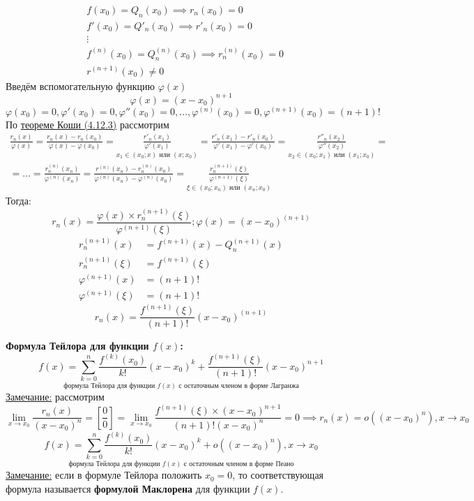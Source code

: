 \documentclass[12pt]{article}
\begin{document}
    \begin{adjustwidth}{1.5em}{1.5em}
        \begin{align*}
            &f(x_0) = Q_n(x_0) \implies r_n(x_0) = 0\\
            &f'(x_0) = Q'_n(x_0) \implies r'_n(x_0) = 0\\
            &\vdots\\
            &f^{(n)}(x_0) = Q^{(n)}_n(x_0) \implies r^{(n)}_n(x_0) = 0\\
            &r^{(n+1)}(x_0) \ne 0
        \end{align*}
        Введём вспомогательную функцию $\varphi(x)$
        \[ \varphi(x) = (x-x_0)^{n+1} \]
        \[ \varphi(x_0) = 0, \varphi'(x_0) = 0, \varphi''(x_0) = 0, \dots, \varphi^{(n)}(x_0) = 0, \varphi^{(n+1)}(x_0) = (n+1)! \]
        По \hyperref[th:4.12.3]{теореме Коши (4.12.3)} рассмотрим
        \begin{gather*}
            \boxed{ \frac{r_n(x)}{\varphi(x)} } = \frac{r_n(x) - r_n(x_0)}{\varphi(x) - \varphi(x_0)} = \underset{x_1 \in (x_0; x) \text{ или } (x; x_0)}{\frac{r'_n(x_1)}{\varphi'(x_1)}} = \frac{r'_n(x_1) - r'_n(x_0)}{\varphi'(x_1) - \varphi'(x_0)} = \underset{x_2 \in (x_0; x_1) \text{ или } (x_1; x_0)}{\frac{r''_n(x_2)}{\varphi''(x_2)}} =\\
            = \dots = \frac{r^{(n)}_n(x_n)}{\varphi^{(n)}(x_n)} = \frac{r^{(n)}(x_n) - r^{(n)}_n(x_0)}{\varphi^{(n)}(x_n)-\varphi^{(n)}(x_0)} = \underset{\xi \in (x_0;x_n) \text{ или } (x_n; x_0)}{\boxed{\frac{r^{(n+1)}_n(\xi)}{\varphi^{(n+1)}(\xi)}}}
        \end{gather*}
        Тогда: \[ r_n(x) = \frac{\varphi(x) \times r^{(n+1)}_n(\xi)}{\varphi^{(n+1)}(\xi)}; \varphi(x) = (x-x_0)^{(n+1)} \]
        \begin{align*}
            r^{(n+1)}_n (x) &= f^{(n+1)}(x) - Q^{(n+1)}_n(x)\\
            r^{(n+1)}_n (\xi) &= f^{(n+1)}(\xi)\\
            \varphi^{(n+1)} (x) &= (n+1)!\\
            \varphi^{(n+1)} (\xi) &= (n+1)!
        \end{align*}
        \[ r_n(x) = \frac{f^{(n+1)}(\xi)}{(n+1)!}(x-x_0)^{(n+1)} \]
    \end{adjustwidth}
    \textbf{Формула Тейлора для функции $f(x)$:}
    \[ \underset{\text{формула Тейлора для функции }f(x)\text{ с остаточным членом в форме Лагранжа}}{\boxed{ f(x) = \sum_{k = 0}^{n} \frac{f^{(k)}(x_0)}{k!}(x-x_0)^k + \frac{f^{(n+1)}(\xi)}{(n+1)!}(x-x_0)^{n+1} }} \]
    \underline{Замечание:} рассмотрим 
    \[ \lim_{x\to x_0}\frac{r_n(x)}{(x-x_0)^n} = \left[\frac{0}{0}\right] = \lim_{x\to x_0} \frac{f^{(n+1)}(\xi) \times (x-x_0)^{n+1}}{(n+1)!(x-x_0)^n} = 0 \implies r_n(x) = o((x-x_0)^n), x \to x_0 \]
    \[ \underset{\text{формула Тейлора для функции }f(x)\text{ с остаточным членом в форме Пеано}}{ \boxed{ f(x) = \sum_{k=0}^{n}\frac{f^{(k)}(x_0)}{k!}(x-x_0)^k + o((x-x_0)^n), x \to x_0 } } \]
    \underline{Замечание:} если в формуле Тейлора положить $x_0 = 0$, то соответствующая формула называется \textbf{формулой Маклорена} для функции $f(x)$.
\end{document}
